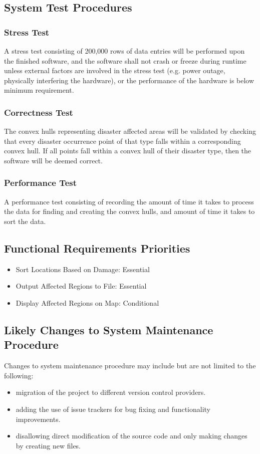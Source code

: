 \documentclass{article}
\begin{document}
\subsection{System Test Procedures}
\subsubsection{Stress Test}
A stress test consisting of 200,000 rows of data entries will be
performed upon the finished software, and the software shall not crash
or freeze during runtime unless external factors are involved in the
stress test (e.g. power outage, physically interfering the hardware),
or the performance of the hardware is below minimum requirement.

\subsubsection{Correctness Test}
The convex hulls representing disaster affected areas will be validated
by checking that every disaster occurrence point of that type falls within a
corresponding convex hull. If all points fall within a convex hull of their
disaster type, then the software will be deemed correct.

\subsubsection {Performance Test}
A performance test consisting of recording the amount of time it takes to
process the data for finding and creating the convex hulls, and amount of
time it takes to sort the data.
\subsection{Functional Requirements Priorities}
\begin{itemize}
    \item Sort Locations Based on Damage: Essential
    \item Output Affected Regions to File: Essential
    \item Display Affected Regions on Map: Conditional
\end{itemize}
\subsection{Likely Changes to System Maintenance Procedure}
Changes to system maintenance procedure may include but are not limited to the following:
\begin{itemize}
    \item migration of the project to different version control providers.
    \item adding the use of issue trackers for bug fixing and functionality improvements.
    \item disallowing direct modification of the source code and only making changes by creating new files.
\end{itemize}
\end{document}
